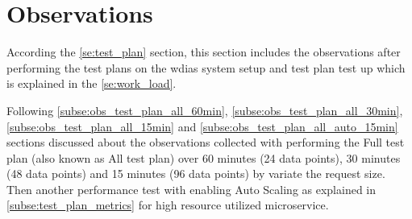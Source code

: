 \section{Observations}
According the \ref{se:test_plan} section, this section includes the observations after performing the test plans on the \acrshort{wdias} system setup and test plan test up which is explained in the \ref{se:work_load}.

Following \ref{subse:obs_test_plan_all_60min}, \ref{subse:obs_test_plan_all_30min}, \ref{subse:obs_test_plan_all_15min} and \ref{subse:obs_test_plan_all_auto_15min} sections discussed about the observations collected with performing the Full test plan (also known as All test plan) over 60 minutes (24 data points), 30 minutes (48 data points) and 15 minutes (96 data points) by variate the request size. Then another performance test with enabling Auto Scaling as explained in \ref{subse:test_plan_metrics} for high resource utilized microservice.



